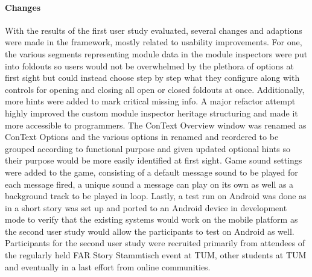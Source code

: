 \paragraph{Changes} With the results of the first user study evaluated, several changes and adaptions were made in the framework, mostly related to usability improvements. For one, the various segments representing module data in the module inspectors were put into foldouts so users would not be overwhelmed by the plethora of options at first sight but could instead choose step by step what they configure along with controls for opening and closing all open or closed foldouts at once. Additionally, more hints were added to mark critical missing info. A major refactor attempt highly improved the custom module inspector heritage structuring and made it more accessible to programmers. 
The ConText Overview window was renamed as ConText Options and the various options in renamed and reordered to be grouped according to functional purpose and given updated optional hints so their purpose would be more easily identified at first sight. 
Game sound settings were added to the game, consisting of a default message sound to be played for each message fired, a unique sound a message can play on its own as well as a background track to be played in loop. 
Lastly, a test run on Android was done as in a short story was set up and ported to an Android device in development mode to verify that the existing systems would work on the mobile platform as the second user study would allow the participants to test on Android as well. 
Participants for the second user study were recruited primarily from attendees of the regularly held FAR Story Stammtisch event at TUM, other students at TUM and eventually in a last effort from online communities.

